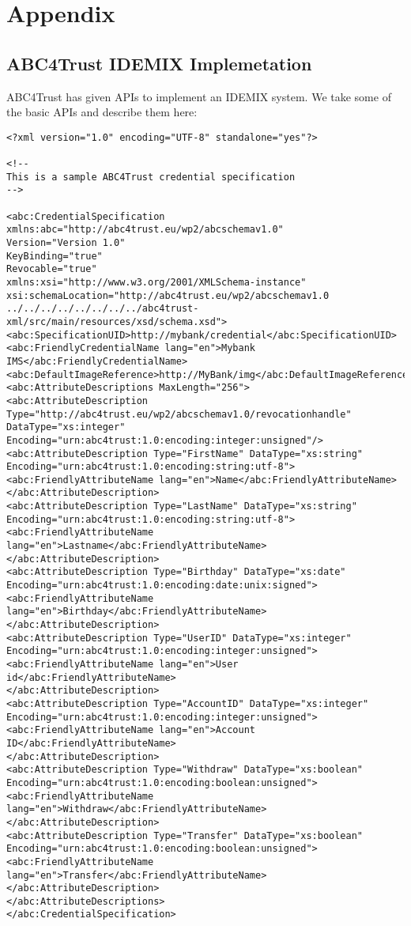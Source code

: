 \chapter{Appendix}
\section{ABC4Trust IDEMIX Implemetation}
ABC4Trust has given APIs to implement an IDEMIX system. We take some of the basic APIs and describe them here:

\lstset{language=XML}
\begin{lstlisting}[caption=IDEMIX Credential Specificataion]
<?xml version="1.0" encoding="UTF-8" standalone="yes"?>

<!--
This is a sample ABC4Trust credential specification
-->

<abc:CredentialSpecification xmlns:abc="http://abc4trust.eu/wp2/abcschemav1.0"
Version="Version 1.0"
KeyBinding="true"
Revocable="true"
xmlns:xsi="http://www.w3.org/2001/XMLSchema-instance" 
xsi:schemaLocation="http://abc4trust.eu/wp2/abcschemav1.0 ../../../../../../../../abc4trust-xml/src/main/resources/xsd/schema.xsd">
<abc:SpecificationUID>http://mybank/credential</abc:SpecificationUID>
<abc:FriendlyCredentialName lang="en">Mybank IMS</abc:FriendlyCredentialName>
<abc:DefaultImageReference>http://MyBank/img</abc:DefaultImageReference>
<abc:AttributeDescriptions MaxLength="256">
<abc:AttributeDescription Type="http://abc4trust.eu/wp2/abcschemav1.0/revocationhandle" DataType="xs:integer" Encoding="urn:abc4trust:1.0:encoding:integer:unsigned"/>
<abc:AttributeDescription Type="FirstName" DataType="xs:string" Encoding="urn:abc4trust:1.0:encoding:string:utf-8">
<abc:FriendlyAttributeName lang="en">Name</abc:FriendlyAttributeName>
</abc:AttributeDescription>
<abc:AttributeDescription Type="LastName" DataType="xs:string" Encoding="urn:abc4trust:1.0:encoding:string:utf-8">
<abc:FriendlyAttributeName lang="en">Lastname</abc:FriendlyAttributeName>
</abc:AttributeDescription>
<abc:AttributeDescription Type="Birthday" DataType="xs:date" Encoding="urn:abc4trust:1.0:encoding:date:unix:signed">
<abc:FriendlyAttributeName lang="en">Birthday</abc:FriendlyAttributeName>
</abc:AttributeDescription>
<abc:AttributeDescription Type="UserID" DataType="xs:integer" Encoding="urn:abc4trust:1.0:encoding:integer:unsigned">
<abc:FriendlyAttributeName lang="en">User id</abc:FriendlyAttributeName>
</abc:AttributeDescription>
<abc:AttributeDescription Type="AccountID" DataType="xs:integer" Encoding="urn:abc4trust:1.0:encoding:integer:unsigned">
<abc:FriendlyAttributeName lang="en">Account ID</abc:FriendlyAttributeName>
</abc:AttributeDescription>
<abc:AttributeDescription Type="Withdraw" DataType="xs:boolean" Encoding="urn:abc4trust:1.0:encoding:boolean:unsigned">
<abc:FriendlyAttributeName lang="en">Withdraw</abc:FriendlyAttributeName>
</abc:AttributeDescription>
<abc:AttributeDescription Type="Transfer" DataType="xs:boolean" Encoding="urn:abc4trust:1.0:encoding:boolean:unsigned">
<abc:FriendlyAttributeName lang="en">Transfer</abc:FriendlyAttributeName>
</abc:AttributeDescription>
</abc:AttributeDescriptions>
</abc:CredentialSpecification>
\end{lstlisting}
